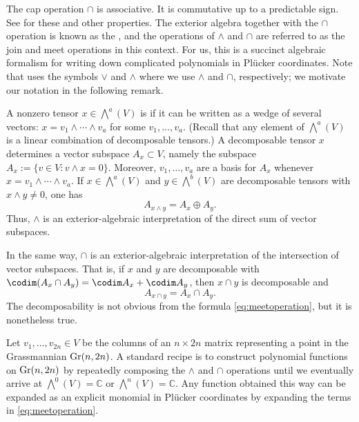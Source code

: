 The cap operation $\cap$ is associative. It is commutative up to a predictable sign. See \cite[Chapter~3]{Sturmfels} for these and other properties. The exterior algebra together with the $\cap$ operation is known as the , and the operations of $\wedge$ and $\cap$ are referred to as the join and meet operations in this context. For us, this is a succinct algebraic formalism for writing down complicated polynomials in Pl\"ucker coordinates. Note that \cite{Sturmfels} uses the symbols $\vee$ and $\wedge$ where we use $\wedge$ and $\cap$, respectively; we motivate our notation in the following remark.

\begin{remark} 
A nonzero tensor $x \in \bigwedge^a(V)$ is  if it can be written as a wedge of several vectors: $x = v_1 \wedge \cdots \wedge v_a$ for some $v_1,\dots,v_a$. (Recall that any element of $\bigwedge^a(V)$ is a linear combination of decomposable tensors.) A decomposable tensor $x$ determines a vector subspace $A_x \subset V$, namely the subspace $A_x := \{v \in V \colon v \wedge x = 0\}$. Moreover, $v_1,\dots,v_a$ are a basis for $A_x$ whenever $x = v_1 \wedge \cdots \wedge v_a$. If $x \in \bigwedge^a(V)$ and $y \in \bigwedge^b(V)$ are decomposable tensors with $x \wedge y \neq 0$, one has 
$$A_{x \wedge y} = A_x \oplus A_y.$$
Thus, $\wedge$ is an exterior-algebraic interpretation of the direct sum of vector subspaces. 

In the same way, $\cap$ is an exterior-algebraic interpretation of the intersection of vector subspaces. That is, if $x$ and $y$ are decomposable with $\codim(A_x \cap A_y) = \codim A_x + \codim A_y$, then $x \cap y$ is decomposable and 
\[A_{x \cap y} = A_x \cap A_y.\]
The decomposability is not obvious from the formula \eqref{eq:meetoperation}, but it is nonetheless true. 
\end{remark}
 

\begin{remark}\label{rmk:cookingwithGC}
Let $v_1,\dots,v_{2n} \in V$ be the columns of an $n \times 2n$ matrix representing a point in the Grassmannian ${\rm Gr}(n,2n)$. A standard recipe is to construct polynomial functions on ${\rm Gr}(n,2n)$ by repeatedly composing the $\wedge$ and $\cap$ operations until we eventually arrive at $\bigwedge^0(V) = \mathbb{C}$ or $\bigwedge^n(V) = \mathbb{C}$. Any function obtained this way can be expanded as an explicit monomial in Pl\"ucker coordinates by expanding the terms in \eqref{eq:meetoperation}.
\end{remark}

